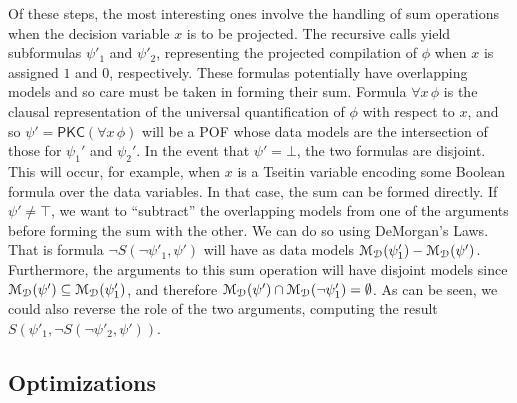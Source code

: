 \documentclass[letterpaper,USenglish,cleveref, autoref, thm-restate]{lipics-v2021}
\newcommand{\tautology}{\top}
\newcommand{\nil}{\bot}
\newcommand{\dmodelset}{{\cal M_{D}}}
\newcommand{\ureduce}[2]{\forall #2\, #1}
\newcommand{\algo}[1]{\textsf{#1}}
\newcommand{\pkc}{\algo{PKC}}
\begin{document}
Of these steps, the most interesting ones involve the handling of sum
operations when the decision variable $x$ is to be projected.  The
recursive calls yield subformulas $\psi'_1$ and $\psi'_2$, representing the projected compilation of $\phi$ when $x$ is assigned $1$ and $0$, respectively.
These
formulas potentially have overlapping models and so care must be taken
in forming their sum.  Formula $\ureduce{\phi}{x}$ is the clausal
representation of the universal quantification of $\phi$ with respect
to $x$, and so $\psi' = \pkc(\ureduce{\phi}{x})$ will be a POF whose
data models are the intersection of those for $\psi_1'$ and $\psi_2'$.  In
the event that $\psi' = \nil$, the two formulas are disjoint.  This
will occur, for example, when $x$ is a Tseitin variable encoding some
Boolean formula over the data variables.  In that case, the sum can be
formed directly.  If $\psi' \not = \tautology$, we want to
``subtract'' the overlapping models from one of the arguments before
forming the sum with the other.  We can do so using DeMorgan's Laws.  
That is formula $\neg S(\neg \psi'_1, \psi')$ will have as data models $\dmodelset(\psi'_1) - \dmodelset(\psi')$.  Furthermore, the arguments to this sum operation will have disjoint models
since $\dmodelset(\psi') \subseteq \dmodelset(\psi'_1)$, and therefore
$\dmodelset(\psi') \cap \dmodelset(\neg \psi'_1) = \emptyset$.
As can be seen, we could also reverse the role of the two arguments, computing the result
$S(\psi'_1, \neg S(\neg \psi'_2, \psi'))$.


\subsection{Optimizations}
\end{document}
